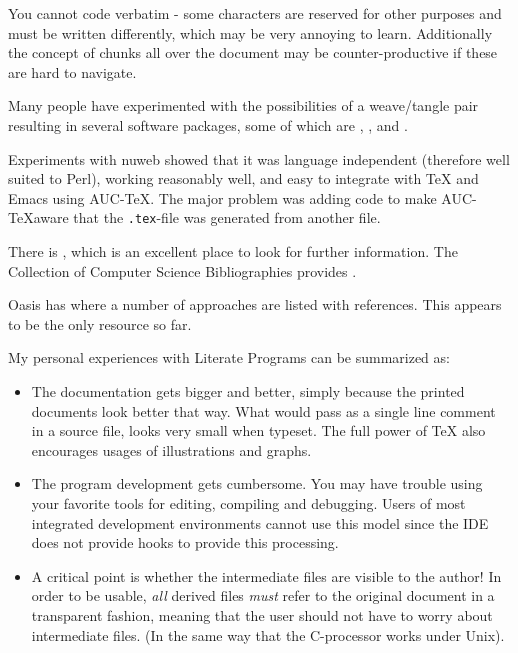 You cannot code verbatim - some characters are reserved for other
purposes and must be written differently, which may be very annoying
to learn.  Additionally the concept of chunks all over the document
may be counter-productive if these are hard to navigate.

Many people have experimented with the possibilities of a weave/tangle
pair resulting in several software packages, some of which are
,
,
 and
.

Experiments with nuweb showed that it was language
independent (therefore well suited to Perl), working
reasonably well, and easy to integrate with {\TeX} and Emacs
using AUC-\TeX.  The major problem was adding code to make
AUC-\TeX aware that the \texttt{.tex}-file was generated
from another file.

There is
, which is an excellent place to
look for further information.  The Collection of Computer Science
Bibliographies provides
.

Oasis has  where a number of
approaches are listed with references.  This appears to be the only
resource so far.

My personal experiences with Literate Programs can be summarized as:

\begin{itemize}
\item The documentation gets bigger and better, simply because the
  printed documents look better that way.  What would pass as a single
  line comment in a source file, looks very small when typeset.  The
  full power of {\TeX} also encourages usages of illustrations and
  graphs.

\item The program development gets cumbersome.  You may have trouble
  using your favorite tools for editing, compiling and debugging.
  Users of most integrated development environments cannot use this
  model since the IDE does not provide hooks to provide this
  processing.

\item A critical point is whether the intermediate files are visible
  to the author! In order to be usable, \textit{all} derived files
  \textit{must} refer to the original document in a transparent
  fashion, meaning that the user should not have to worry about
  intermediate files.  (In the same way that the C-processor works
  under Unix).
\end{itemize}

